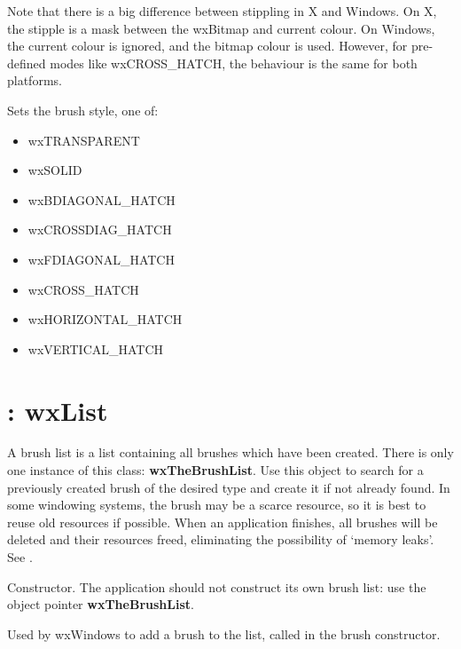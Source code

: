 Note that there is a big difference between stippling in X and Windows.
On X, the stipple is a mask between the wxBitmap and current colour.
On Windows, the current colour is ignored, and the bitmap colour is used.
However, for pre-defined modes like wxCROSS\_HATCH, the behaviour is the
same for both platforms.

\label{wxbrushsetstyle}


Sets the brush style, one of:

\begin{itemize}\itemsep=0pt
\item wxTRANSPARENT
\item wxSOLID
\item wxBDIAGONAL\_HATCH
\item wxCROSSDIAG\_HATCH
\item wxFDIAGONAL\_HATCH
\item wxCROSS\_HATCH
\item wxHORIZONTAL\_HATCH
\item wxVERTICAL\_HATCH
\end{itemize}

\section{: wxList}\label{wxbrushlist}

A brush list is a list containing all brushes which have been created.
There is only one instance of this class: {\bf wxTheBrushList}.  Use
this object to search for a previously created brush of the desired
type and create it if not already found. In some windowing systems,
the brush may be a scarce resource, so it is best to reuse old
resources if possible.  When an application finishes, all brushes will
be deleted and their resources freed, eliminating the possibility of
`memory leaks'. See .



Constructor.  The application should not construct its own brush list:
use the object pointer {\bf wxTheBrushList}.



Used by wxWindows to add a brush to the list, called in the brush constructor.

